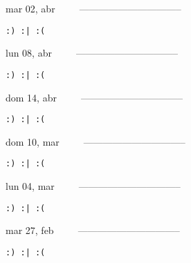 \documentclass[letterpaper,10pt]{article}
\begin{document}
\begin{multicols}{3}
{mar 02, abr\ \ \ \ \ --------------------------------}
\begin{flushright}\begin{small}\texttt{:) :| :(}\end{small}\end{flushright}
\vfill
{lun 08, abr\ \ \ \ \ --------------------------------}
\begin{flushright}\begin{small}\texttt{:) :| :(}\end{small}\end{flushright}\par
\vfill
{dom 14, abr\ \ \ \ \ --------------------------------}
\begin{flushright}\begin{small}\texttt{:) :| :(}\end{small}\end{flushright}\par
\vfill
\end{multicols}
\vspace{1.05cm}

\begin{multicols}{3}
{dom 10, mar\ \ \ \ \ --------------------------------}
\begin{flushright}\begin{small}\texttt{:) :| :(}\end{small}\end{flushright}
\vfill
{lun 04, mar\ \ \ \ \ --------------------------------}
\begin{flushright}\begin{small}\texttt{:) :| :(}\end{small}\end{flushright}\par
\vfill
{mar 27, feb\ \ \ \ \ --------------------------------}
\begin{flushright}\begin{small}\texttt{:) :| :(}\end{small}\end{flushright}\par
\vfill
\end{multicols}
\vspace{1.05cm}
\end{document}
